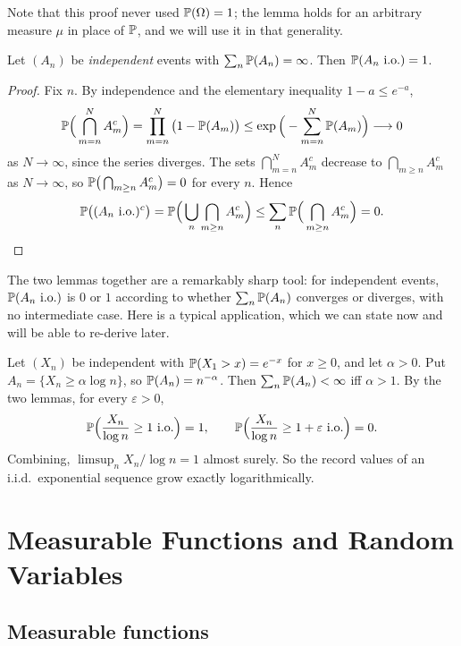 \documentclass[a4paper]{scrartcl}
\begin{document}
Note that this proof never used $\mathbb{P}(\Omega)=1$; the lemma holds for an arbitrary measure $\mu$ in place of $\mathbb{P}$, and we will use it in that generality.

\begin{lemma}\label{lem:bc2}
	Let $(A_n)$ be \emph{independent} events with $\sum_n \mathbb{P}(A_n) = \infty$. Then $\mathbb{P}(A_n \text{ i.o.}) = 1$.
\end{lemma}
\begin{proof}
	Fix $n$. By independence and the elementary inequality $1 - a \leq e^{-a}$,
	$$
	\mathbb{P}\Big( \bigcap_{m=n}^N A_m^c \Big) = \prod_{m=n}^N \big(1 - \mathbb{P}(A_m)\big) \leq \exp\Big( - \sum_{m=n}^N \mathbb{P}(A_m) \Big) \longrightarrow 0
	$$
	as $N \to \infty$, since the series diverges. The sets $\bigcap_{m=n}^N A_m^c$ decrease to $\bigcap_{m \geq n} A_m^c$ as $N \to \infty$, so $\mathbb{P}\big( \bigcap_{m\geq n} A_m^c \big) = 0$ for every $n$. Hence
	$$
	\mathbb{P}\big( (A_n \text{ i.o.})^c \big) = \mathbb{P}\Big( \bigcup_n \bigcap_{m \geq n} A_m^c \Big) \leq \sum_n \mathbb{P}\Big( \bigcap_{m\geq n} A_m^c\Big) = 0. \qedhere
	$$
\end{proof}

The two lemmas together are a remarkably sharp tool: for independent events, $\mathbb{P}(A_n \text{ i.o.})$ is $0$ or $1$ according to whether $\sum_n \mathbb{P}(A_n)$ converges or diverges, with no intermediate case. Here is a typical application, which we can state now and will be able to re-derive later.

\begin{example}\label{ex:exp-records}
	Let $(X_n)$ be independent with $\mathbb{P}(X_1 > x) = e^{-x}$ for $x \geq 0$, and let $\alpha > 0$. Put $A_n = \{X_n \geq \alpha \log n\}$, so $\mathbb{P}(A_n) = n^{-\alpha}$. Then $\sum_n \mathbb{P}(A_n) < \infty$ iff $\alpha > 1$. By the two lemmas, for every $\varepsilon>0$,
	$$
	\mathbb{P}\Big( \frac{X_n}{\log n} \geq 1 \text{ i.o.} \Big) = 1, \qquad \mathbb{P}\Big( \frac{X_n}{\log n} \geq 1 + \varepsilon \text{ i.o.}\Big) = 0.
	$$
	Combining, $\limsup_n X_n / \log n = 1$ almost surely. So the record values of an i.i.d.\ exponential sequence grow exactly logarithmically.
\end{example}

\section{Measurable Functions and Random Variables}

\subsection{Measurable functions}
\end{document}
